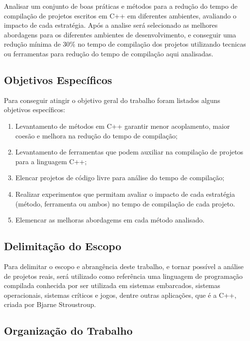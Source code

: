 Analisar um conjunto de boas práticas e métodos para a redução do
 tempo de compilação de projetos escritos em C++ em diferentes ambientes,
 avaliando o impacto de cada estratégia.
 Após a analise será selecionado as melhores abordagens
 para os diferentes ambientes de desenvolvimento, e conseguir uma
 redução mínima de 30\% no tempo de compilação dos projetos utilizando
 tecnicas ou ferramentas para redução do tempo de compilação aqui analisadas.

\subsection*{Objetivos Específicos}

Para conseguir atingir o objetivo geral do trabalho foram listados
 alguns objetivos específicos:

\begin{enumerate}
    \item Levantamento de métodos em C++ garantir menor acoplamento,
 maior coesão e melhora na redução do tempo de compilação;
    \item Levantamento de ferramentas que podem auxiliar na compilação
 de projetos para a linguagem C++;
    \item Elencar projetos de código livre para análise do tempo de
 compilação;
    \item Realizar experimentos que permitam avaliar o impacto de cada
 estratégia (método, ferramenta ou ambos) no tempo de compilação de
 cada projeto.
    \item Elemencar as melhoras abordagems em cada método analisado.
\end{enumerate}


\subsection*{Delimitação do Escopo}

Para delimitar o escopo e abrangência deste trabalho, e tornar possível
 a análise de projetos reais, será utilizado como referência uma linguagem
 de programação compilada conhecida por ser utilizada em sistemas embarcados,
 sistemas operacionais, sistemas críticos e jogos, dentre outras aplicações,
 que é a C++, criada por Bjarne Stroustroup\cite{BjarneC++}.

\subsection*{Organização do Trabalho}


